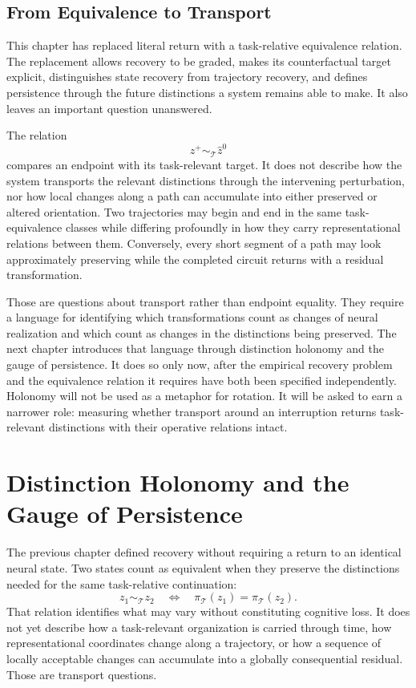 \documentclass[11pt]{book}
\begin{document}
\section*{From Equivalence to Transport}

This chapter has replaced literal return with a task-relative equivalence relation. The replacement allows recovery to be graded, makes its counterfactual target explicit, distinguishes state recovery from trajectory recovery, and defines persistence through the future distinctions a system remains able to make. It also leaves an important question unanswered.

The relation
\[
z^{+}\sim_{\mathcal T}\widehat z^{0}
\]
compares an endpoint with its task-relevant target. It does not describe how the system transports the relevant distinctions through the intervening perturbation, nor how local changes along a path can accumulate into either preserved or altered orientation. Two trajectories may begin and end in the same task-equivalence classes while differing profoundly in how they carry representational relations between them. Conversely, every short segment of a path may look approximately preserving while the completed circuit returns with a residual transformation.

Those are questions about transport rather than endpoint equality. They require a language for identifying which transformations count as changes of neural realization and which count as changes in the distinctions being preserved. The next chapter introduces that language through distinction holonomy and the gauge of persistence. It does so only now, after the empirical recovery problem and the equivalence relation it requires have both been specified independently. Holonomy will not be used as a metaphor for rotation. It will be asked to earn a narrower role: measuring whether transport around an interruption returns task-relevant distinctions with their operative relations intact.

\chapter{Distinction Holonomy and the Gauge of Persistence}

The previous chapter defined recovery without requiring a return to an identical neural state. Two states count as equivalent when they preserve the distinctions needed for the same task-relative continuation:
\[
z_1\sim_{\mathcal T}z_2
\quad\Longleftrightarrow\quad
\pi_{\mathcal T}(z_1)=\pi_{\mathcal T}(z_2).
\]
That relation identifies what may vary without constituting cognitive loss. It does not yet describe how a task-relevant organization is carried through time, how representational coordinates change along a trajectory, or how a sequence of locally acceptable changes can accumulate into a globally consequential residual. Those are transport questions.
\end{document}
